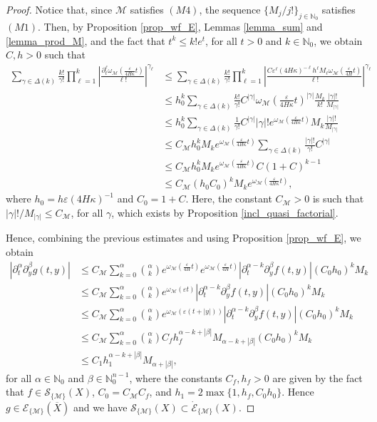 \documentclass[11pt,reqno]{amsart}
\numberwithin{equation}{section}
\newcommand{\N}{{\mathbb{N}}} %
\newcommand{\E}{{\mathcal{E}}}
\newcommand{\M}{{\mathcal{M}}} %
\newcommand{\X}{{\overline{X}}}
\begin{document}
\begin{proof}
	Notice that, since $\M$ satisfies $(M4)$, the sequence $\{M_j/j!\}_{j\in\N_0}$ satisfies $(M1)$. Then, by Proposition \ref{prop_wf_E}, Lemmas \ref{lemma_sum} and \ref{lemma_prod_M}, and the fact that $t^k\leq k!e^t$, for all $t>0$ and $k\in\N_0$, we obtain $C,h>0$ such that
	\begin{align*}
		\sum_{\gamma\in\Delta(k)}\frac{k!}{\gamma!}\prod_{\ell=1}^k\left|\frac{\partial_t^\ell \omega_\M\left(\tfrac{\varepsilon}{4H\kappa}t\right)}{\ell!}\right|^{\gamma_\ell} & \leq \sum_{\gamma\in\Delta(k)}\frac{k!}{\gamma!}\prod_{\ell=1}^k\left|\frac{C\varepsilon^\ell (4H\kappa)^{-\ell}h^\ell M_\ell \omega_\M\left(\tfrac{\varepsilon}{4H}t\right)}{\ell!}\right|^{\gamma_\ell}\\
		& \leq h_0^k \sum_{\gamma\in\Delta(k)} \frac{k!}{\gamma!} C^{|\gamma|} \omega_\M\left(\tfrac{\varepsilon }{4H\kappa}t\right)^{|\gamma|}\frac{M_k}{k!}\frac{|\gamma|!}{M_{|\gamma|}}\\
		& \leq h_0^k \sum_{\gamma\in\Delta(k)} \frac{1}{\gamma!} C^{|\gamma|}|\gamma|! e^{\omega_\M \left(\tfrac{\varepsilon }{4H\kappa}t\right)} M_k\frac{|\gamma|!}{M_{|\gamma|}}\\
		& \leq C_\M h_0^k M_k e^{\omega_\M\left(\tfrac{\varepsilon}{4H\kappa}t\right)} \sum_{\gamma\in\Delta(k)} \frac{|\gamma|!}{\gamma!} C^{|\gamma|}\\
		& \leq C_\M h_0^k M_k e^{\omega_\M \left(\tfrac{\varepsilon}{4H\kappa}t\right)} C(1+C)^{k-1}\\
		& \leq C_\M(h_0C_0)^kM_k e^{\omega_\M \left(\tfrac{\varepsilon }{4H\kappa}t\right)},
	\end{align*}
	where $h_0=h\varepsilon(4H\kappa)^{-1}$ and $C_0=1+C$. Here, the constant $C_\M>0$ is such that $|\gamma|!/M_{|\gamma|}\leq C_\M$, for all $\gamma$, which exists by Proposition \ref{incl_quasi_factorial}.
	
	Hence, combining the previous estimates and using Proposition \ref{prop_wf_E}, we obtain
	\begin{align*}
		|\partial_t^\alpha\partial_y^\beta g(t,y)| & \leq C_\M \sum_{k=0}^\alpha\binom{\alpha}{k}  e^{\omega_\M \left(\tfrac{\varepsilon}{4H}t\right)} e^{\omega_\M \left(\tfrac{\varepsilon}{4H}t\right)}|\partial_t^{\alpha-k}\partial_y^\beta f(t,y)|(C_0h_0)^k M_k\\
		& \leq C_\M \sum_{k=0}^\alpha\binom{\alpha}{k}  e^{\omega_\M(\varepsilon t)}|\partial_t^{\alpha-k}\partial_y^\beta f(t,y)|(C_0h_0)^k M_k\\
		& \leq C_\M \sum_{k=0}^\alpha\binom{\alpha}{k}  e^{\omega_\M(\varepsilon (t+|y|))}|\partial_t^{\alpha-k}\partial_y^\beta f(t,y)|(C_0h_0)^k M_k\\
		& \leq C_\M \sum_{k=0}^\alpha\binom{\alpha}{k} C_fh_f^{\alpha-k+|\beta|}M_{\alpha-k+|\beta|}(C_0h_0)^kM_k\\
		& \leq C_1h_1^{\alpha-k+|\beta|}M_{\alpha+|\beta|},
	\end{align*}
	for all $\alpha\in\N_0$ and $\beta\in\N_0^{n-1}$, where the constants $C_f,h_f>0$ are given by the fact that $f\in\mathcal{S}_{\{\M\}}(X)$, $C_0=C_\M C_f$, and $h_1=2\max\{1,h_f,C_0h_0\}$. Hence $g\in\E_{\{\M\}}(\X)$ and we have $\mathcal{S}_{\{\M\}}(X) \subset \dot{\E}_{\{\M\}}(X)$.
	

\end{proof}
\end{document}
